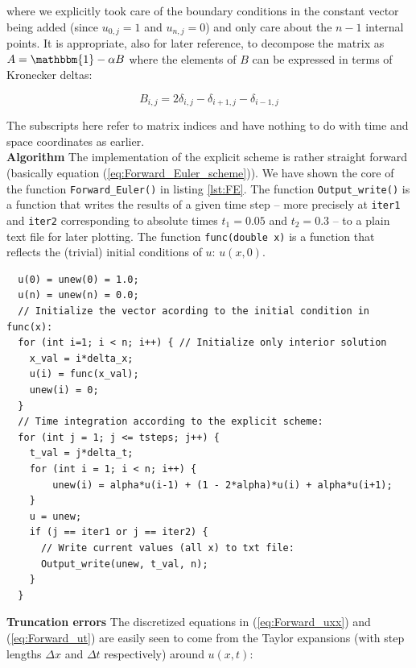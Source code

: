 \documentclass[a4paper, 11pt, notitlepage,english]{article}
\newcommand{\id}{\mathbbm{1}}
\begin{document}
where we explicitly took care of the boundary conditions in the constant vector being added (since $u_{0,j} = 1$ and $u_{n,j} = 0$) and only care about the $n-1$ internal points. It is appropriate, also for later reference, to decompose the matrix as $A = \id - \alpha B$ where the elements of $B$ can be expressed in terms of Kronecker deltas: 

\begin{equation}
B_{i,j} = 2\delta_{i,j}-\delta_{i+1,j}-\delta_{i-1,j}
\label{eq:Matrix_B}
\end{equation}

The subscripts here refer to matrix indices and have nothing to do with time and space coordinates as earlier. \\

\textbf{Algorithm} \newline
The implementation of the explicit scheme is rather straight forward (basically equation (\ref{eq:Forward_Euler_scheme})). We have shown the core of the function \texttt{Forward\_Euler()} in listing \ref{lst:FE}. The function \texttt{Output\_write()} is a function that writes the results of a given time step – more precisely at \texttt{iter1} and \texttt{iter2} corresponding to absolute times $t_1 = 0.05$ and $t_2 = 0.3$ – to a plain text file for later plotting. The function \texttt{func(double x)} is a function that reflects the (trivial) initial conditions of $u$: $u(x,0)$.

\begin{center}
\begin{lstlisting}
  u(0) = unew(0) = 1.0;
  u(n) = unew(n) = 0.0;
  // Initialize the vector acording to the initial condition in func(x):
  for (int i=1; i < n; i++) { // Initialize only interior solution
  	x_val = i*delta_x;
  	u(i) = func(x_val);
  	unew(i) = 0;
  }
  // Time integration according to the explicit scheme:
  for (int j = 1; j <= tsteps; j++) {
  	t_val = j*delta_t;
  	for (int i = 1; i < n; i++) {
  		unew(i) = alpha*u(i-1) + (1 - 2*alpha)*u(i) + alpha*u(i+1);
  	}
  	u = unew;
  	if (j == iter1 or j == iter2) {
  	  // Write current values (all x) to txt file:
  	  Output_write(unew, t_val, n);
    }
  }
\end{lstlisting}
\end{center}

\textbf{Truncation errors} \newline
The discretized equations in (\ref{eq:Forward_uxx}) and (\ref{eq:Forward_ut}) are easily seen to come from the Taylor expansions (with step lengths $\Delta x$ and $\Delta t$ respectively) around $u(x,t)$:
\end{document}
